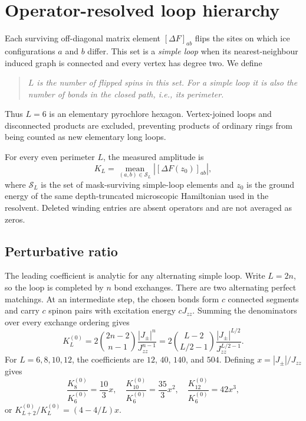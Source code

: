 \documentclass[aps,prb,twocolumn,amsmath,amssymb,superscriptaddress,
longbibliography,floatfix]{revtex4-2}
\newcommand{\Jzz}{J_{zz}}
\newcommand{\Jpm}{J_{\pm}}
\begin{document}


\section{Operator-resolved loop hierarchy}
\label{sec:loops}

Each surviving off-diagonal matrix element $[\Delta F]_{ab}$ flips the sites
on which ice configurations $a$ and $b$ differ.  This set is a
\emph{simple loop} when its nearest-neighbour induced graph is connected and
every vertex has degree two.  We define
\begin{quote}
\emph{$L$ is the number of flipped spins in this set.  For a simple loop it is
also the number of bonds in the closed path, i.e., its perimeter.}
\end{quote}
Thus $L=6$ is an elementary pyrochlore hexagon.  Vertex-joined loops and
disconnected products are excluded, preventing products of ordinary rings
from being counted as new elementary long loops.

For every even perimeter $L$, the measured amplitude is
\begin{equation}
 K_L=\underset{(a,b)\in\mathcal S_L}{\operatorname{mean}}
 \left|[\Delta F(z_0)]_{ab}\right|,
 \label{eq:KL}
\end{equation}
where $\mathcal S_L$ is the set of mask-surviving simple-loop elements and
$z_0$ is the ground energy of the same depth-truncated microscopic Hamiltonian
used in the resolvent.  Deleted winding entries are absent operators and are
not averaged as zeros.

\subsection{Perturbative ratio}

The leading coefficient is analytic for any alternating simple loop.  Write
$L=2n$, so the loop is completed by $n$ bond exchanges.  There are two
alternating perfect matchings.  At an intermediate step, the chosen bonds
form $c$ connected segments and carry $c$ spinon pairs with excitation energy
$c\Jzz$.  Summing the denominators over every exchange ordering gives
\begin{equation}
 K_L^{(0)}=
 2\binom{2n-2}{n-1}\frac{|\Jpm|^n}{\Jzz^{n-1}}
 =2\binom{L-2}{L/2-1}
 \frac{|\Jpm|^{L/2}}{\Jzz^{L/2-1}}.
 \label{eq:theoryKL}
\end{equation}
For $L=6,8,10,12$, the coefficients are $12$, $40$, $140$, and $504$.
Defining $x=|\Jpm|/\Jzz$ gives
\begin{equation}
 \frac{K_8^{(0)}}{K_6^{(0)}}=\frac{10}{3}x,\quad
 \frac{K_{10}^{(0)}}{K_6^{(0)}}=\frac{35}{3}x^2,\quad
 \frac{K_{12}^{(0)}}{K_6^{(0)}}=42x^3,
 \label{eq:theoryratios}
\end{equation}
or $K_{L+2}^{(0)}/K_L^{(0)}=(4-4/L)x$.
\end{document}
